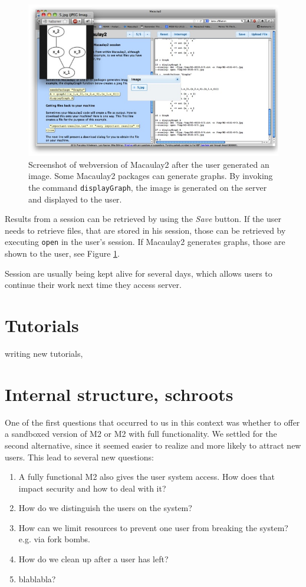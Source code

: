 \documentclass[]{article}
\begin{document}
\begin{figure}[htb]
    \includegraphics[width=.95\textwidth]{withGraph.jpg}
    \caption{Screenshot of webversion of Macaulay2 after the user generated an image. Some Macaulay2 packages can generate graphs. By invoking the command {\tt displayGraph}, the image is generated on the server and displayed to the user.}
    \label{fig:graph}
\end{figure}

Results from a session can be retrieved by using the {\it Save} button. If the user needs to retrieve files, that are stored in his session, those can be retrieved by executing {\tt open} in the user's session. If Macaulay2 generates graphs, those are shown to the user, see Figure \ref{fig:graph}.

Session are usually being kept alive for several days, which allows users to continue their work next time they access server. 

\section{Tutorials}
writing new tutorials,
\section{Internal structure, schroots}
One of the first questions that occurred to us in this context was whether to offer a sandboxed version of M2 or M2 with full functionality.
We settled for the second alternative, since it seemed easier to realize and more likely to attract new users.
This lead to several new questions:
\begin{enumerate}
\item A fully functional M2 also gives the user system access. How does that impact security and how to deal with it?
\item How do we distinguish the users on the system?
\item How can we limit resources to prevent one user from breaking the system? e.g. via fork bombs.
\item How do we clean up after a user has left?
\item blablabla?
\end{enumerate}
\end{document}
